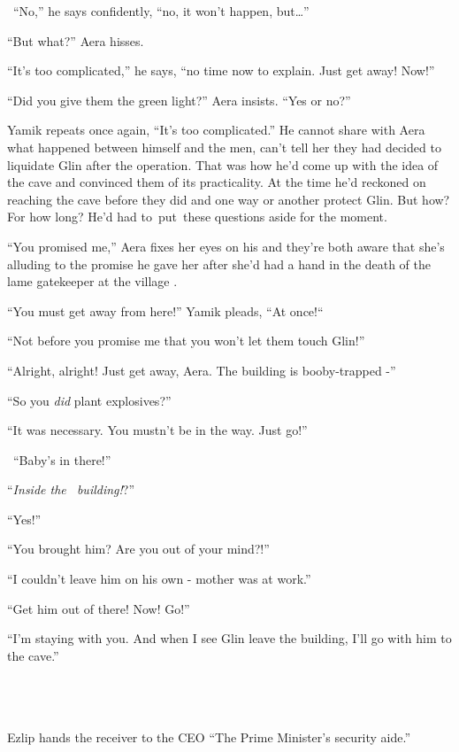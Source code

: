 \documentclass[twoside,11pt]{book}
\begin{document}
\ ``No,'' he says{ }confidently,
``no,{ }it won't happen, but{\dots}''

``But what?'' Aera hisses.

``It's too complicated,'' he says, ``no time now to explain. Just get away!
Now!''

``Did you give them the green light?'' Aera insists. ``Yes or no?''

Yamik repeats once again, ``It's too complicated.'' He
cannot{ }share with Aera what happened between himself and the men, can't tell
her they had decided to liquidate Glin after the operation. That was how he'd come up with the idea of the cave and
convinced them of its practicality. At the time he'd reckoned on reaching the cave before they did and one way or
another protect Glin. But how? For how long? He'd had to~put~these questions aside for the moment.

``You promised me,'' Aera fixes her eyes on his and they're both aware that she's alluding to
the promise he gave her after she'd had a hand in the death of the lame gatekeeper at the village .

``You must get away from here!'' Yamik pleads, ``At
once!``~~~~~~~~~~~

``Not before you promise me that you won't let them touch Glin!''

``Alright, alright! Just get away, Aera{. T}he building is
booby-trapped -''

``So you \textit{did}{ }plant explosives?''

``{I}t was{ }necessary. You
mustn't be in the way. Just go!''

~``Baby's in there!''

``\textit{Inside the~ building!}?''

``Yes!''

``You brought him? Are you out of your mind?!''

``I couldn't leave him on his own {{}-} mother was at
work.''

``Get him out of there! Now! Go!''

``I'm staying with you. And when I see Glin leave the building, I'll go with him to the
cave.''

~

\chapter{}

Ezlip hands the receiver to the CEO ``The Prime Minister's security aide.''
\end{document}
